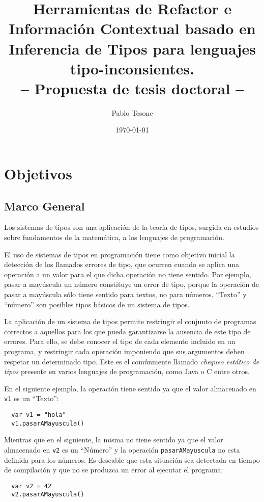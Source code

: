\documentclass[a4paper,10pt]{article}
\title{Herramientas de Refactor e Información Contextual basado en Inferencia de Tipos para lenguajes tipo-inconsientes.\\
-- Propuesta de tesis doctoral -- }
\author{Pablo Tesone}
\date{\today}
\begin{document}
\maketitle

\section{Objetivos}
\subsection{Marco General}

Los sistemas de tipos\cite{Pier02a} son una aplicación de la teoría de tipos\cite{Pier02a}, surgida en estudios sobre fundamentos de la matemática, a los lenguajes de programación. 

El uso de sistemas de tipos en programación tiene como objetivo inicial la detección de los llamados errores de tipo\cite{Miln78a}, que ocurren cuando se aplica una operación  a un valor para el que dicha operación no tiene sentido. Por ejemplo, pasar a mayúscula un número constituye un error de tipo, porque la operación de pasar a mayúscula sólo tiene sentido para textos, no para números. 
``Texto'' y ``número'' son posibles tipos básicos de un sistema de tipos.

La aplicación de un sistema de tipos permite restringir el conjunto de programas correctos a aquellos para los que pueda garantizarse la ausencia de este tipo de errores. Para ello, se debe conocer el tipo de cada elemento incluido en un programa, y restringir cada operación imponiendo que sus argumentos deben respetar un determinado tipo\cite{Miln78a}. Este es el comúnmente llamado \emph{chequeo estático de tipos} presente en varios lenguajes de programación, como Java o C entre otros.

En el siguiente ejemplo, la operación tiene sentido ya que el valor almacenado en \verb|v1| es un ``Texto'':

\begin{verbatim}
  var v1 = "hola"
  v1.pasarAMayuscula()
\end{verbatim}

Mientras que en el siguiente, la misma no tiene sentido ya que el valor almacenado en \verb|v2| es un ``Número'' y la operación \verb|pasarAMayuscula| no esta definida para los números. Es deseable que esta situación sea detectada en tiempo de compilación y que no se produzca un error al ejecutar el programa:

\begin{verbatim}
  var v2 = 42
  v2.pasarAMayuscula()
\end{verbatim}
\end{document}
